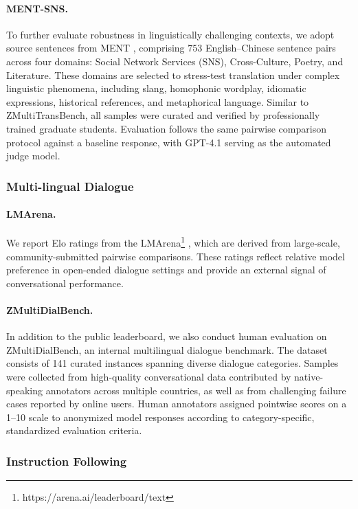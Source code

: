 \documentclass{article}
\theoremstyle{definition}
\begin{document}
\paragraph{MENT-SNS.}
To further evaluate robustness in linguistically challenging contexts, we adopt source sentences from MENT \citep{tian2026ment}, comprising \(753\) English–Chinese sentence pairs across four domains: Social Network Services (SNS), Cross-Culture, Poetry, and Literature.
These domains are selected to stress-test translation under complex linguistic phenomena, including slang, homophonic wordplay, idiomatic expressions, historical references, and metaphorical language. Similar to ZMultiTransBench, all samples were curated and verified by professionally trained graduate students.
Evaluation follows the same pairwise comparison protocol against a baseline response, with GPT-4.1 serving as the automated judge model.

\subsubsection{Multi-lingual Dialogue}
\paragraph{LMArena.}
We report Elo ratings from the LMArena\footnote{https://arena.ai/leaderboard/text}
, which are derived from large-scale, community-submitted pairwise comparisons. These ratings reflect relative model preference in open-ended dialogue settings and provide an external signal of conversational performance. 

\paragraph{ZMultiDialBench.}
In addition to the public leaderboard, we also conduct human evaluation on ZMultiDialBench, an internal multilingual dialogue benchmark. The dataset consists of 141 curated instances spanning diverse dialogue categories. Samples were collected from high-quality conversational data contributed by native-speaking annotators across multiple countries, as well as from challenging failure cases reported by online users. 
Human annotators assigned pointwise scores on a 1–10 scale to anonymized model responses according to category-specific, standardized evaluation criteria. 

\subsubsection{Instruction Following}
\end{document}
